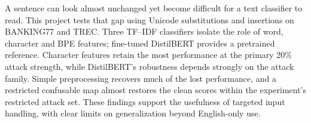 A sentence can look almost unchanged yet become difficult for a text classifier to read. This project tests that gap using Unicode substitutions and insertions on BANKING77 and TREC. Three TF--IDF classifiers isolate the role of word, character and BPE features; fine-tuned DistilBERT provides a pretrained reference. Character features retain the most performance at the primary 20\% attack strength, while DistilBERT's robustness depends strongly on the attack family. Simple preprocessing recovers much of the lost performance, and a restricted confusable map almost restores the clean scores within the experiment's restricted attack set. These findings support the usefulness of targeted input handling, with clear limits on generalization beyond English-only use.
